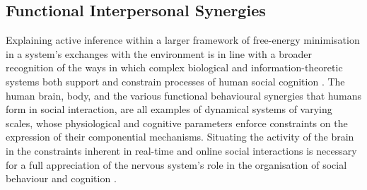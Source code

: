 \begin{mccorrection}
\subsection{Functional Interpersonal Synergies}
Explaining active inference within a larger framework of free-energy minimisation in a system's exchanges with the environment is in line with a broader recognition of the ways in which complex biological and information-theoretic systems both support and constrain processes of human social cognition \citep{Dale2014}.  The human brain, body, and the various functional behavioural synergies that humans form in social interaction, are all examples of dynamical systems of varying scales, whose physiological and cognitive parameters enforce constraints on the expression of their componential mechanisms.  Situating the activity of the brain in the constraints inherent in real-time and online social interactions is necessary for a full appreciation of the nervous system's role in the organisation of social behaviour and cognition \citep{Coey2012}.


\end{mccorrection}
